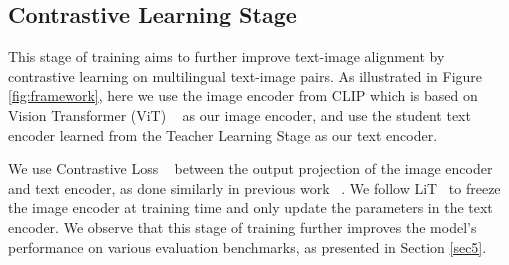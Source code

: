 

\subsection{Contrastive Learning Stage}
This stage of training aims to further improve text-image alignment by contrastive learning on multilingual text-image pairs. As illustrated in Figure \ref{fig:framework}, here we use the image encoder from CLIP which is based on Vision Transformer (ViT) ~\cite{dosovitskiy2020image} as our image encoder, and use the student text encoder learned from the Teacher Learning Stage as our text encoder. 

We use Contrastive Loss ~\cite{hadsell2006dimensionality} between the output projection of the image encoder and text encoder, as done similarly in previous work ~\cite{radford2021learning}. We follow LiT~\cite{zhai2022lit} to freeze the image encoder at training time and only update the parameters in the text encoder. We observe that this stage of training further improves the  model's performance on various evaluation benchmarks, as presented in Section \ref{sec5}.



